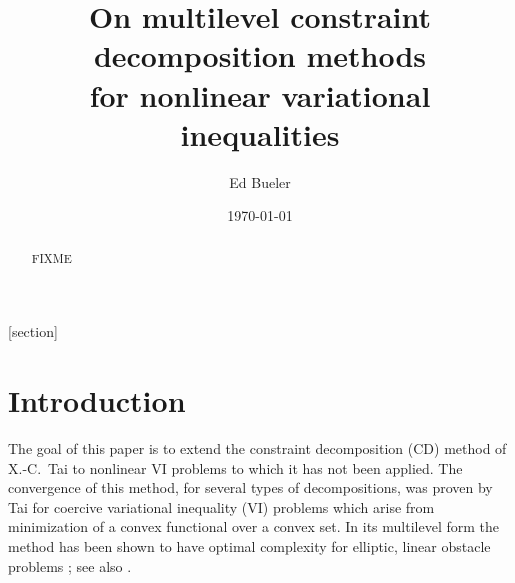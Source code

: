 \documentclass[letterpaper,final,12pt,reqno]{amsart}
\theoremstyle{cstyle}
\theoremstyle{cstyle*}
\theoremstyle{dstyle}
\numberwithin{equation}{section}
\numberwithin{figure}{section}
\numberwithin{table}{section}
\numberwithin{theorem}{section}
\begin{document}
\title[On multilevel constraint decomposition methods]{On multilevel constraint decomposition methods \\ for nonlinear variational inequalities}

\author{Ed Bueler}

\date{\today}

\begin{abstract} FIXME
\end{abstract}

\maketitle


\thispagestyle{empty}

[section]


\section{Introduction} \label{sec:intro}

The goal of this paper is to extend the constraint decomposition (CD) method of X.-C.~Tai \cite{Tai2003} to nonlinear VI problems to which it has not been applied.  The convergence of this method, for several types of decompositions, was proven by Tai for coercive variational inequality (VI) problems which arise from minimization of a convex functional over a convex set.  In its multilevel form the method has been shown to have optimal complexity for elliptic, linear obstacle problems \cite[Subsection 5.4]{Tai2003}; see also \cite[Theorem 4.6 and Algorithm 4.7]{GraeserKornhuber2009}.
\end{document}
